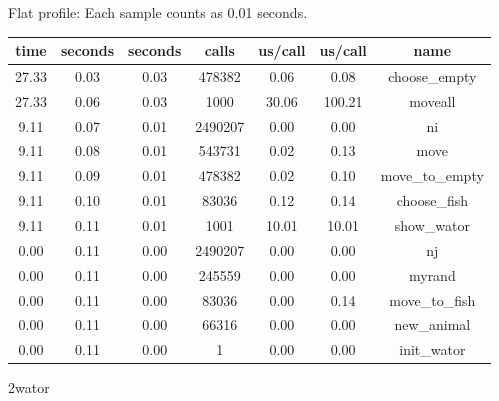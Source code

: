\documentclass[a4paper,10pt]{article}
\begin{document}
Flat profile:
Each sample counts as 0.01 seconds.
\begin{center}
  \begin{tabular}{| c | c | c | c | c | c | c |}
    \hline
 time  &   seconds  &   seconds &    calls &  us/call &   us/call &   name \\ \hline    
 27.33 &      0.03 &     0.03 &   478382 &     0.06 &      0.08 &   choose\_empty \\ \hline
 27.33 &      0.06 & 0.03    & 1000    & 30.06    & 100.21     &      moveall \\ \hline
  9.11 &      0.07 &     0.01 &  2490207 &     0.00 &      0.00 &   ni \\ \hline
  9.11 &      0.08 &     0.01 &   543731 &     0.02 &      0.13 &   move \\ \hline
  9.11 &      0.09 &     0.01 &   478382 &     0.02 &      0.10 &   move\_to\_empty \\ \hline
  9.11 &      0.10 &     0.01 &    83036 &     0.12 &      0.14 &   choose\_fish \\ \hline
  9.11 &      0.11 &     0.01 &     1001 &    10.01 &     10.01 &   show\_wator \\ \hline
  0.00 &      0.11 &     0.00 &  2490207 &     0.00 &      0.00 &   nj \\ \hline
  0.00 &      0.11 &     0.00 &   245559 &     0.00 &      0.00 &   myrand \\ \hline
  0.00 &      0.11 &     0.00 &    83036 &     0.00 &      0.14 &   move\_to\_fish \\ \hline
  0.00 &      0.11 &     0.00 &    66316 &     0.00 &      0.00 &   new\_animal \\ \hline
  0.00 &      0.11 &     0.00 &        1 &     0.00 &      0.00 &   init\_wator \\ \hline
  \end{tabular}
\end{center}
  2wator
\end{document}
